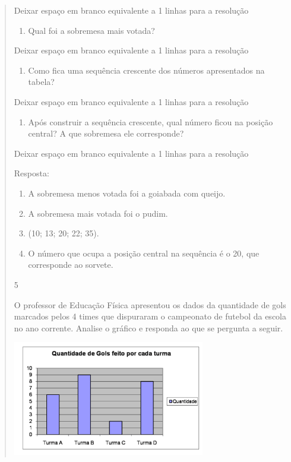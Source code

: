 \begin{mdframed}[linewidth=2pt,linecolor=salmao,roundcorner=2pt]
\begin{itemize}
{\begin{itemize}
\begin{escolha}
{\begin{quote}
{\begin{escolha}
{{{Deixar espaço em branco equivalente a 1 linhas para a resolução

\begin{enumerate}
\item
  Qual foi a sobremesa mais votada?
\end{enumerate}

Deixar espaço em branco equivalente a 1 linhas para a resolução

\begin{enumerate}
\item
  Como fica uma sequência crescente dos números apresentados na tabela?
\end{enumerate}

Deixar espaço em branco equivalente a 1 linhas para a resolução

\begin{enumerate}
\item
  Após construir a sequência crescente, qual número ficou na posição
  central? A que sobremesa ele corresponde?
\end{enumerate}

Deixar espaço em branco equivalente a 1 linhas para a resolução

Resposta:

\begin{enumerate}
\item
  A sobremesa menos votada foi a goiabada com queijo.
\item
  A sobremesa mais votada foi o pudim.
\item
  (10; 13; 20; 22; 35).
\item
  O número que ocupa a posição central na sequência é o 20, que corresponde ao sorvete.
\end{enumerate}

\num{5}

O professor de Educação Física apresentou os dados da quantidade de gols
marcados pelos 4 times que dispuraram o campeonato de futebol da escola no ano
corrente. Analise o gráfico e responda ao que se pergunta a seguir.

\includegraphics[width=3.30769in,height=1.97201in]{media/image97.png}

}}}
\end{escolha}}
\end{quote}}
\end{escolha}
\end{itemize}}
\end{itemize}
\end{mdframed}
